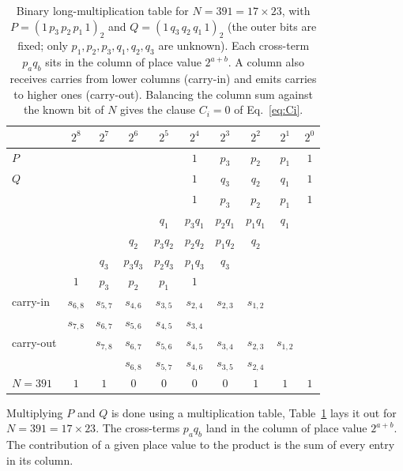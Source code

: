 \documentclass[reprint,twocolumn,amsmath,amssymb,nofootinbib]{revtex4-2}
\begin{document}
\begin{table}[tp]
\centering
\caption{Binary long-multiplication table for $N = 391 = 17 \times 23$,
with $P = (1\,p_3\,p_2\,p_1\,1)_2$ and
$Q = (1\,q_3\,q_2\,q_1\,1)_2$ (the outer bits are fixed; only
$p_1,p_2,p_3,q_1,q_2,q_3$ are unknown). Each cross-term $p_a q_b$ sits
in the column of place value $2^{a+b}$. A column also receives carries
from lower columns (carry-in) and emits carries to higher ones
(carry-out). Balancing the column sum against the known bit of $N$
gives the clause $C_i = 0$ of Eq.~\eqref{eq:Ci}.}
\label{tab:multtable}
\small
\setlength{\tabcolsep}{10pt}
\renewcommand{\arraystretch}{1}
\begin{tabular}{l|ccccccccc}
\toprule
& $2^8$ & $2^7$ & $2^6$ & $2^5$ & $2^4$ & $2^3$ & $2^2$ & $2^1$ & $2^0$ \\
\midrule
$P$ & & & & & $1$   & $p_3$ & $p_2$ & $p_1$ & $1$ \\
$Q$ & & & & & $1$   & $q_3$ & $q_2$ & $q_1$ & $1$ \\
\midrule
            & & & & & $1$ & $p_3$ & $p_2$ & $p_1$ & $1$ \\
            & & & & $q_1$ & $p_3 q_1$ & $p_2 q_1$ & $p_1 q_1$ & $q_1$ & \\
            & & & $q_2$ & $p_3 q_2$ & $p_2 q_2$ & $p_1 q_2$ & $q_2$ & & \\
            & & $q_3$ & $p_3 q_3$ & $p_2 q_3$ & $p_1 q_3$ & $q_3$ & & & \\
            & $1$ & $p_3$ & $p_2$ & $p_1$ & $1$ & & & & \\
\midrule
carry-in    & $s_{6,8}$ & $s_{5,7}$ & $s_{4,6}$ & $s_{3,5}$ & $s_{2,4}$ & $s_{2,3}$ & $s_{1,2}$ & & \\
            & $s_{7,8}$ & $s_{6,7}$ & $s_{5,6}$ & $s_{4,5}$ & $s_{3,4}$ & & & & \\
\midrule
carry-out   & & $s_{7,8}$ & $s_{6,7}$ & $s_{5,6}$ & $s_{4,5}$ & $s_{3,4}$ & $s_{2,3}$ & $s_{1,2}$ & \\
            & & & $s_{6,8}$ & $s_{5,7}$ & $s_{4,6}$ & $s_{3,5}$ & $s_{2,4}$ & & \\
\midrule
$N = 391$   & $1$ & $1$ & $0$ & $0$ & $0$ & $0$ & $1$ & $1$ & $1$ \\
\bottomrule
\end{tabular}
\end{table}

Multiplying $P$ and $Q$ is done using a multiplication table, Table~\ref{tab:multtable} lays it out for $N = 391 = 17 \times 23$. The cross-terms $p_a q_b$ land in the column of place value $2^{a+b}$. The contribution of a given place value to the product is the sum of every entry in its column.
\end{document}
